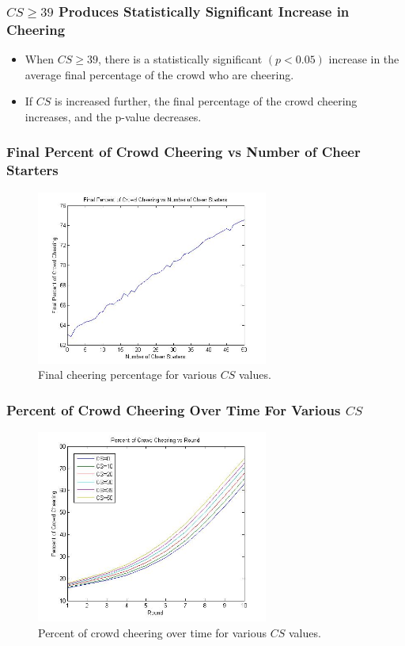 \documentclass[compress,handout,10pt]{beamer}
\let\olditem\item
\renewcommand{\item}{\setlength{\itemsep}{0.5\baselineskip}\olditem}
\begin{document}
\begin{frame}
	\frametitle{$CS\geq 39$ Produces Statistically Significant Increase in Cheering}
	\begin{itemize}
		\item When $CS\geq39$, there is a statistically significant $(p<0.05)$ increase in the average final percentage of the crowd who are cheering.
		\item If $CS$ is increased further, the final percentage of the crowd cheering increases, and the p-value decreases.
	\end{itemize}
\end{frame}

\begin{frame}
	\frametitle{Final Percent of Crowd Cheering vs Number of Cheer Starters}
	\begin{figure} [h]
		\begin{center}
    			\includegraphics [width=3in] {46(1).jpg}
    			\caption {{\tiny Final cheering percentage for various $CS$ values.}}
    		\end{center}
    	\end {figure}	
\end{frame}

\begin{frame}
	\frametitle{Percent of Crowd Cheering Over Time For Various $CS$}
	\begin{figure} [h]
		\begin{center}
    			\includegraphics [width=3in] {46(2).jpg}
    			\caption {{\tiny Percent of crowd cheering over time for various $CS$ values.}}
    		\end{center}
    	\end {figure}	
\end{frame}
\end{document}
